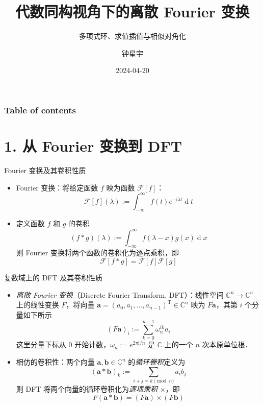 \documentclass[
  ignorenonframetext,
  chinese-hans,
]{beamer}
\title{代数同构视角下的离散 Fourier 变换}
\subtitle{多项式环、求值插值与相似对角化}
\author{钟星宇}
\date{2024-04-20}
\institute{北京理工大学}
\renewcommand*\contentsname{Table of contents}
\newcommand\contentsname{Table of contents}
\theoremstyle{plain}
\theoremstyle{plain}
\theoremstyle{plain}
\theoremstyle{plain}
\theoremstyle{remark}
\begin{document}
\frame{\titlepage}

\renewcommand*\contentsname{Table of contents}
\begin{frame}[allowframebreaks]
  \frametitle{Table of contents}
  \setcounter{tocdepth}{3}
  \tableofcontents
\end{frame}

\section{1. 从 Fourier 变换到
DFT}\label{ux4ece-fourier-ux53d8ux6362ux5230-dft}

\begin{frame}{Fourier 变换及其卷积性质}
\label{fourier-ux53d8ux6362ux53caux5176ux5377ux79efux6027ux8d28}
\newcommand{\T}{\mathrm{T}}
\newcommand{\Ker}{\operatorname{Ker}}
\newcommand{\Image}{\operatorname{Im}}
\renewcommand{\vec}{\boldsymbol}
\newcommand{\Aut}{\operatorname{Aut}}
\newcommand{\diag}{\operatorname{diag}}
\renewcommand{\i}{\mathrm{i}}
\newcommand{\diff}{\operatorname{d}\!}
\newcommand{\Iso}{\operatorname{Iso}}

\begin{itemize}
\item
  Fourier 变换：将给定函数 \(f\) 映为函数 \(\mathcal F[f]\)： \[
  \mathcal F[f](\lambda) := \int_{-\infty}^{\infty} f(t) e^{- \mathrm{i}\lambda t} \operatorname{d}\!t
  \]
\item
  定义函数 \(f\) 和 \(g\) 的卷积 \[
  (f*g)(\lambda) := \int_{-\infty}^{\infty} f(\lambda-x) g(x) \operatorname{d}\!x
  \] 则 Fourier 变换将两个函数的卷积化为逐点乘积，即 \[
  \mathcal F[f*g] = \mathcal F[f] \mathcal F[g]
  \]
\end{itemize}
\end{frame}

\begin{frame}{复数域上的 DFT 及其卷积性质}
\label{ux590dux6570ux57dfux4e0aux7684-dft-ux53caux5176ux5377ux79efux6027ux8d28}
\begin{itemize}
\item
  \emph{离散 Fourier 变换}（Discrete Fourier Transform, DFT）：线性空间
  \(\mathbb C^n \to \mathbb C^n\) 上的线性变换 \(F\)，将向量
  \(\boldsymbol a  = (a_0,a_1,\dots,a_{n-1})^\mathrm{T}\in \mathbb C^n\)
  映为 \(F \boldsymbol a\)，其第 \(i\) 个分量如下所示 \[
  (F \boldsymbol a)_i := \sum_{k=0}^{n-1} \omega_n^{ik} a_i
  \] 这里分量下标从 \(0\)
  开始计数，\(\omega_n := e^{2 \pi \mathrm{i}/ n}\) 是 \(\mathbb C\)
  上的一个 \(n\) 次本原单位根．
\item
  相仿的卷积性：两个向量
  \(\boldsymbol a, \boldsymbol b \in \mathbb C^n\)
  的\emph{循环卷积}定义为 \[
  (\boldsymbol a * \boldsymbol b)_k := \sum_{i + j = k \pmod{n}} a_i b_j
  \] 则 DFT 将两个向量的循环卷积化为\emph{逐项乘积} \(\times\)，即 \[
  F(\boldsymbol a * \boldsymbol b) = (F \boldsymbol a) \times (F \boldsymbol b)
  \]
\end{itemize}
\end{frame}
\end{document}
